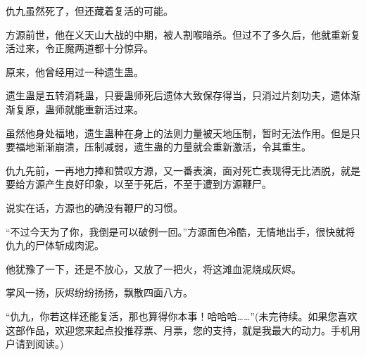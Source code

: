 \begin{this_body}
仇九虽然死了，但还藏着复活的可能。

方源前世，他在义天山大战的中期，被人割喉暗杀。但过不了多久后，他就重新复活过来，令正魔两道都十分惊异。

原来，他曾经用过一种遗生蛊。

遗生蛊是五转消耗蛊，只要蛊师死后遗体大致保存得当，只消过片刻功夫，遗体渐渐复原，蛊师就能重新活过来。

虽然他身处福地，遗生蛊种在身上的法则力量被天地压制，暂时无法作用。但是只要福地渐渐崩溃，压制减弱，遗生蛊的力量就会重新激活，令其重生。

仇九先前，一再地力捧和赞叹方源，又一番表演，面对死亡表现得无比洒脱，就是要给方源产生良好印象，以至于死后，不至于遭到方源鞭尸。

说实在话，方源也的确没有鞭尸的习惯。

“不过今天为了你，我倒是可以破例一回。”方源面色冷酷，无情地出手，很快就将仇九的尸体斩成肉泥。

他犹豫了一下，还是不放心，又放了一把火，将这滩血泥烧成灰烬。

掌风一扬，灰烬纷纷扬扬，飘散四面八方。

“仇九，你若这样还能复活，那也算得你本事！哈哈哈……”(未完待续。如果您喜欢这部作品，欢迎您来起点投推荐票、月票，您的支持，就是我最大的动力。手机用户请到阅读。)

\end{this_body}

